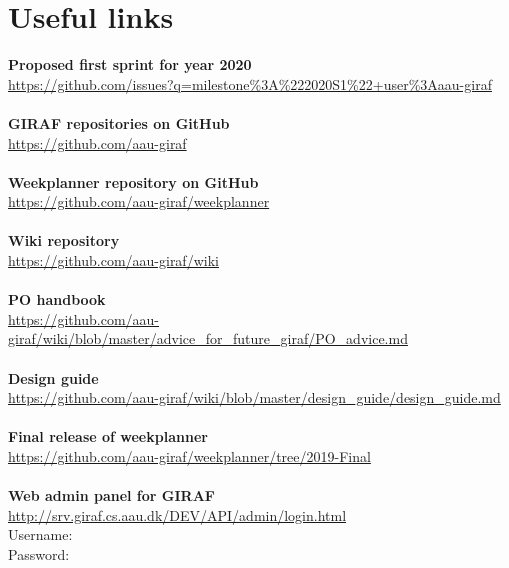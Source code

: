 \newpage
\chapter{Useful links}
\textbf{Proposed first sprint for year 2020} \\
\href{https://github.com/issues?q=milestone%3A%222020S1%22+user%3Aaau-giraf}{https://github.com/issues?q=milestone\%3A\%222020S1\%22+user\%3Aaau-giraf}
\\\\
\textbf{GIRAF repositories on GitHub} \\
\href{https://github.com/aau-giraf}{https://github.com/aau-giraf}
\\\\
\textbf{Weekplanner repository on GitHub} \\
\href{https://github.com/aau-giraf/weekplanner}{https://github.com/aau-giraf/weekplanner}
\\\\
\textbf{Wiki repository} \\
\href{https://github.com/aau-giraf/wiki}{https://github.com/aau-giraf/wiki}
\\\\
\textbf{PO handbook} \\
\href{https://github.com/aau-giraf/wiki/blob/master/advice_for_future_giraf/PO_advice.md}{https://github.com/aau-giraf/wiki/blob/master/advice\_for\_future\_giraf/PO\_advice.md}
\\\\
\textbf{Design guide} \\
\href{https://github.com/aau-giraf/wiki/blob/master/design_guide/design_guide.md}{https://github.com/aau-giraf/wiki/blob/master/design\_guide/design\_guide.md}
\\\\
\textbf{Final release of weekplanner} \\
\href{https://github.com/aau-giraf/weekplanner/tree/2019-Final}{https://github.com/aau-giraf/weekplanner/tree/2019-Final}
\\\\
\textbf{Web admin panel for GIRAF} \\
\href{http://srv.giraf.cs.aau.dk/DEV/API/admin/login.html}{http://srv.giraf.cs.aau.dk/DEV/API/admin/login.html} \\
Username:  \\
Password:  \\